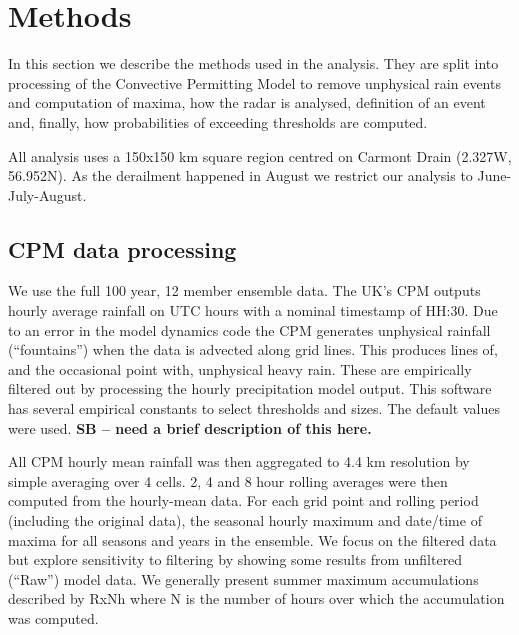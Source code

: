 \documentclass[11pt,a4paper]{article}
\begin{document}
\section{Methods}
In this section we describe the methods used in the analysis. They are split into processing of the Convective Permitting Model to remove unphysical rain events  and computation of maxima, how the radar is analysed, definition of an event and, finally, how probabilities of exceeding thresholds are computed. 

All analysis uses a 150x150 km square region centred on Carmont Drain (2.327W, 56.952N). As the derailment happened in August we restrict our analysis to June-July-August. 

\subsection{CPM data processing}
We use the full 100 year, 12 member ensemble data. The UK's CPM outputs hourly average rainfall on UTC hours with a nominal timestamp of HH:30. Due to an error in the model dynamics code the CPM generates unphysical rainfall (``fountains'') when the data is advected along grid lines. This produces lines of, and the occasional point with, unphysical heavy rain. These are empirically filtered out  by processing the hourly precipitation model output. This software has several empirical constants to select thresholds and sizes. The default values were used.  \textbf{SB -- need a brief description of this here. }
 
All CPM hourly mean rainfall was then aggregated to 4.4 km resolution by simple averaging over 4 cells.  2, 4  and 8 hour rolling averages were then computed from the hourly-mean data. For each grid point and rolling period (including the original data),  the seasonal hourly maximum and date/time of maxima for all seasons and years in the ensemble. We focus on the filtered data but  explore sensitivity to filtering by showing some results from unfiltered (``Raw'') model data. We generally present summer  maximum accumulations described by RxNh where N is the number of hours over which the accumulation was computed. 
\end{document}
